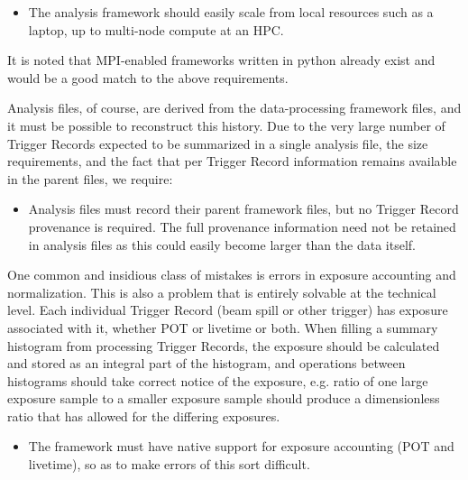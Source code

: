 \documentclass[../main-v1.tex]{subfiles}
\begin{document}
\begin{itemize}
\item The analysis framework should easily scale from local resources such as a laptop, up to multi-node compute at an HPC.
\end{itemize}

It is noted that MPI-enabled frameworks written in python already exist and would be a good match to the above requirements.

Analysis files, of course, are derived from the data-processing framework files, and it must be possible to reconstruct this history. Due to the very large number of Trigger Records expected to be summarized in a single analysis file, the size requirements, and the fact that per Trigger Record information remains available in the parent files, we require:

\begin{itemize}

\item Analysis files must record their parent framework files, but no Trigger Record provenance is required.  The full provenance information need not be retained in analysis files as this could easily become larger than the data itself.
\end{itemize}

One common and insidious class of mistakes is errors in exposure accounting and normalization. This is also a problem that is entirely solvable at the technical level.  Each individual Trigger Record (beam spill or other trigger) has exposure associated with it, whether POT or livetime or both. When filling a summary histogram from processing Trigger Records, the exposure should be calculated and stored as an integral part of the histogram, and operations between histograms should take correct notice of the exposure, e.g. ratio of one large exposure sample to a smaller exposure sample should produce a dimensionless ratio that has allowed for the differing exposures.

\begin{itemize}

\item The framework must have native support for exposure accounting (POT and livetime), so as to make errors of this sort difficult.
\end{itemize}
\end{document}

